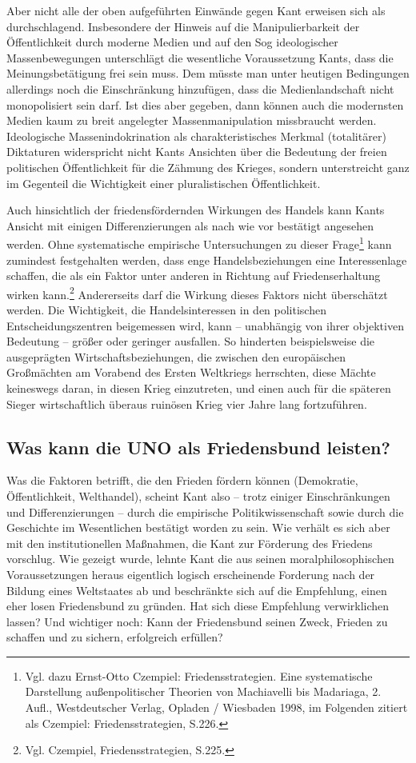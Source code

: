 \documentclass[12pt,a4paper,ngerman]{article}
\begin{document}
Aber nicht alle der oben aufgeführten Einwände gegen Kant erweisen
sich als durchschlagend. Insbesondere der Hinweis auf die
Manipulierbarkeit der Öffentlichkeit durch moderne Medien und auf den
Sog ideologischer Massenbewegungen unterschlägt die wesentliche
Voraussetzung Kants, dass die Meinungsbetätigung frei sein muss. Dem
müsste man unter heutigen Bedingungen allerdings noch die Einschränkung
hinzufügen, dass die Medienlandschaft nicht monopolisiert sein darf.
Ist dies aber gegeben, dann können auch die modernsten Medien kaum zu
breit angelegter Massenmanipulation missbraucht werden.
Ideologische Massenindokrination als charakteristisches Merkmal
(totalitärer) Diktaturen widerspricht nicht Kants Ansichten über
die Bedeutung der freien politischen Öffentlichkeit für die Zähmung
des Krieges, sondern unterstreicht ganz im Gegenteil die Wichtigkeit
einer pluralistischen Öffentlichkeit.

Auch hinsichtlich der friedensfördernden Wirkungen des Handels kann
Kants Ansicht mit einigen Differenzierungen als nach wie vor bestätigt
angesehen werden. Ohne systematische empirische Untersuchungen zu
dieser Frage\footnote{Vgl. dazu Ernst-Otto Czempiel:
  Friedensstrategien. Eine systematische Darstellung außenpolitischer
  Theorien von Machiavelli bis Madariaga, 2. Aufl., Westdeutscher
  Verlag, Opladen / Wiesbaden 1998, im Folgenden zitiert als Czempiel:
  Friedensstrategien, S.226.} kann zumindest festgehalten werden, dass
enge Handelsbeziehungen eine Interessenlage schaffen, die als ein
Faktor unter anderen in Richtung auf Friedenserhaltung wirken
kann.\footnote{Vgl. Czempiel, Friedensstrategien, S.225.}
Andererseits darf die Wirkung dieses Faktors nicht überschätzt werden.
Die Wichtigkeit, die Handelsinteressen in den politischen
Entscheidungszentren beigemessen wird, kann -- unabhängig von ihrer
objektiven Bedeutung -- größer oder geringer ausfallen. So hinderten
beispielsweise die ausgeprägten Wirtschaftsbeziehungen, die zwischen
den europäischen Großmächten am Vorabend des Ersten Weltkriegs
herrschten, diese Mächte keineswegs daran, in diesen Krieg
einzutreten, und einen auch für die späteren Sieger wirtschaftlich
überaus ruinösen Krieg vier Jahre lang fortzuführen.

\subsection{Was kann die UNO als Friedensbund leisten?}

Was die Faktoren betrifft, die den Frieden fördern können (Demokratie,
Öffentlichkeit, Welthandel), scheint Kant also -- trotz einiger
Einschränkungen und Differenzierungen -- durch die empirische
Politikwissenschaft sowie durch die Geschichte im Wesentlichen
bestätigt worden zu sein. Wie verhält es sich aber mit den
institutionellen Maßnahmen, die Kant zur Förderung des Friedens
vorschlug. Wie gezeigt wurde, lehnte Kant die aus seinen
moralphilosophischen Voraussetzungen heraus eigentlich logisch
erscheinende Forderung nach der Bildung eines Weltstaates ab und
beschränkte sich auf die Empfehlung, einen eher losen Friedensbund zu
gründen. Hat sich diese Empfehlung verwirklichen lassen? Und wichtiger
noch: Kann der Friedensbund seinen Zweck, Frieden zu schaffen und zu
sichern, erfolgreich erfüllen?
\end{document}
